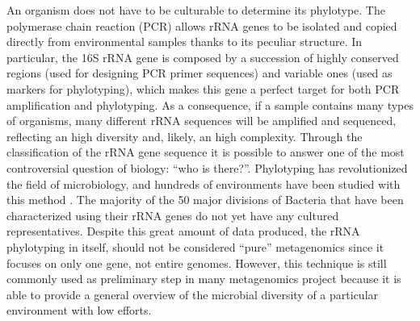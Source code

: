 An organism does not have to be culturable to determine its phylotype. The polymerase chain reaction (PCR) allows rRNA genes to be isolated and copied directly from environmental samples thanks to its peculiar structure. In particular, the 16S rRNA gene is composed by a succession of highly conserved regions (used for designing PCR primer sequences) and variable ones (used as markers for phylotyping), which makes this gene a perfect target for both PCR amplification and phylotyping. As a consequence, if a sample contains many types of organisms, many different rRNA sequences will be amplified and sequenced, reflecting an high diversity and, likely, an high complexity. Through the classification of the rRNA gene sequence it is possible to answer one of the most controversial question of biology: ``who is there?''. Phylotyping has revolutionized the field of microbiology, and hundreds of environments have been studied with this method \cite{saulnier2011gastrointestinal, lu2008turkey, biddle2008metagenomic, krober2009phylogenetic}. The majority of the 50 major divisions of Bacteria that have been characterized using their rRNA genes do not yet have any cultured representatives. Despite this great amount of data produced, the rRNA phylotyping in itself, should not be considered ``pure'' metagenomics since it focuses on only one gene, not entire genomes. However, this technique is still commonly used as preliminary step in many metagenomics project because it is able to provide a general overview of the microbial diversity of a particular environment with low efforts.\\
